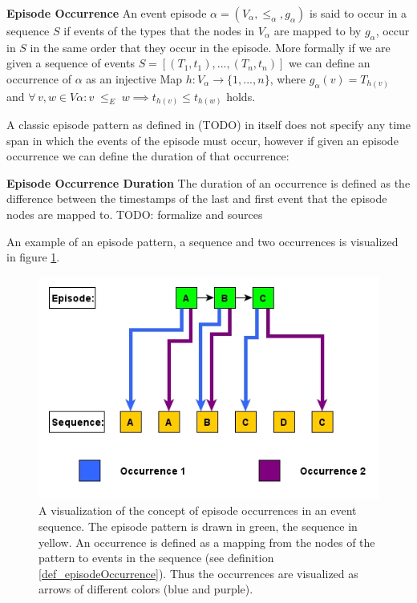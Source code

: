 \begin{mydef}
\label{def_episodeOccurrence}
\textbf{Episode Occurrence} An event episode $\alpha = (V_\alpha,{\leq}_{\alpha},g_\alpha)$ is said to occur in a sequence $S$ if events of the types that the nodes in $V_\alpha$ are mapped to by $g_\alpha$, occur in $S$ in the same order that they occur in the episode. More formally if we are given a sequence of events $S=[(T_1,t_1),...,(T_n,t_n)]$ we can define an occurrence of $\alpha$ as an injective Map $h:V_\alpha \rightarrow \{1,...,n\}$, where $g_\alpha (v) = T_{h(v)}$ and $\forall \, v,w \in V\alpha : v \;{\leq}_{E}\; w \implies t_{h(v)} \le t_{h(w)}$ holds. \cite{mannila1995discovering}
\end{mydef}

A classic episode pattern as defined in (TODO) in itself does not specify any time span in which the events of the episode must occur, however if given an episode occurrence we can define the duration of that occurrence:

\begin{mydef}
\label{def_episodeOccurrence}
\textbf{Episode Occurrence Duration} The duration of an occurrence is defined as the difference between the timestamps of the last and first event that the episode nodes are mapped to. TODO: formalize and sources
\end{mydef}

An example of an episode pattern, a sequence and two occurrences is visualized in figure \ref{fig_occurrenceExample}.

\begin{figure}[h]
	\centering
  	\includegraphics[width=\textwidth]{occurrenceExample}
	\caption{A visualization of the concept of episode occurrences in an event sequence. The episode pattern is drawn in green, the sequence in yellow. An occurrence is defined as a mapping from the nodes of the pattern to events in the sequence (see definition \ref{def_episodeOccurrence}). Thus the occurrences are visualized as arrows of different colors (blue and purple). }
	\label{fig_occurrenceExample}
\end{figure}



